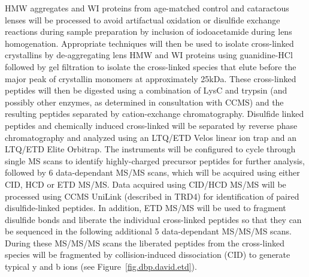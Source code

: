 \documentclass[arial,11pt]{article}
\begin{document}

HMW aggregates and WI proteins from age-matched control and cataractous lenses will be processed to avoid artifactual oxidation or disulfide exchange reactions during sample preparation by inclusion of iodoacetamide during lens homogenation.  Appropriate techniques will then be used to isolate cross-linked crystallins by de-aggregating lens HMW and WI proteins using guanidine-HCl followed by gel filtration to isolate the cross-linked species that elute before the major peak of crystallin monomers at approximately 25kDa. These cross-linked peptides will then be digested using a combination of LysC and trypsin (and possibly other enzymes, as determined in consultation with CCMS) and the resulting peptides separated by cation-exchange chromatography. %
%
Disulfide linked peptides and chemically induced cross-linked will be separated by reverse phase chromatography and analyzed using an LTQ/ETD Velos linear ion trap and an LTQ/ETD Elite Orbitrap.  The instruments will be configured to cycle through single MS scans to identify highly-charged precursor peptides for further analysis, followed by 6 data-dependant MS/MS scans, which will be acquired using either CID, HCD or ETD MS/MS. Data acquired using CID/HCD MS/MS will be processed using CCMS UniLink (described in TRD4) for identification of paired disulfide-linked peptides. In addition, ETD MS/MS will be used to fragment disulfide bonds and liberate the individual cross-linked peptides so that they can be sequenced in the following additional 5 data-dependant MS/MS/MS scans. During these MS/MS/MS scans the liberated peptides from the cross-linked species will be fragmented by collision-induced dissociation (CID) to generate typical y and b ions (see Figure~\ref{fig.dbp.david.etd}).
\end{document}

